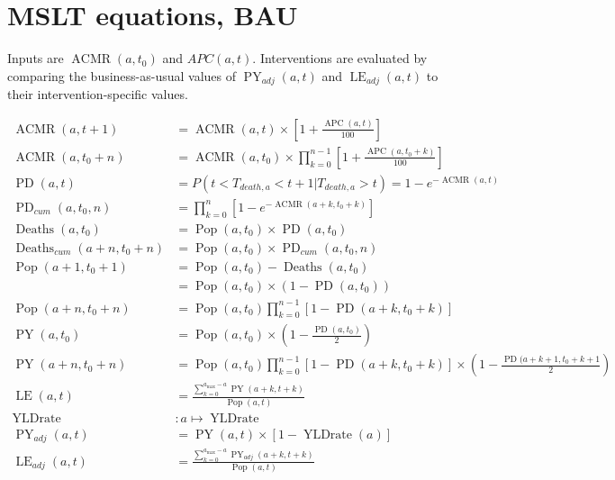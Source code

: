 \documentclass[12pt]{scrartcl}
\DeclareMathOperator{\APC}{APC}
\DeclareMathOperator{\ACMR}{ACMR}
\DeclareMathOperator{\PD}{PD}
\DeclareMathOperator{\PY}{PY}
\DeclareMathOperator{\LE}{LE}
\DeclareMathOperator{\Pop}{Pop}
\DeclareMathOperator{\Deaths}{Deaths}
\DeclareMathOperator{\YLDrate}{YLDrate}
\begin{document}
\section*{MSLT equations, BAU}

Inputs are \(\ACMR(a,t_0)\) and \(APC(a, t)\).
Interventions are evaluated by comparing the business-as-usual values of
\(\PY_{adj}(a, t)\) and \(\LE_{adj}(a, t)\) to their intervention-specific
values.

\begin{align*}
  \ACMR(a, t+1) &= \ACMR(a, t) \times \left[ 1 + \frac{\APC(a, t)}{100}\right] \\
  \ACMR(a, t_0+n) &= \ACMR(a, t_0) \times
  \prod_{k=0}^{n-1} \left[ 1 + \frac{\APC(a, t_0 + k)}{100} \right] \\
  \PD(a, t) &= P(t < T_{death,a} < t + 1 | T_{death,a} > t) = 1 - e^{-\ACMR(a, t)} \\
  \PD_{cum}(a, t_0, n) &= \prod_{k = 0}^n \left[ 1 - e^{-\ACMR(a+k, t_0+k)} \right] \\
  \Deaths(a, t_0) &= \Pop(a, t_0) \times \PD(a, t_0) \\
  \Deaths_{cum}(a+n, t_0+n) &= \Pop(a, t_0) \times \PD_{cum}(a, t_0, n) \\
  \Pop(a+1, t_0+1) &= \Pop(a, t_0) - \Deaths(a, t_0) \\
  &= \Pop(a, t_0) \times (1 - \PD(a, t_0)) \\
  \Pop(a+n, t_0+n) &= \Pop(a, t_0) \prod_{k=0}^{n-1}\left[1 - \PD(a+k, t_0+k)\right]\\
  \PY(a, t_0) &= \Pop(a, t_0) \times \left(1 - \frac{\PD(a,t_0)}{2}\right) \\
  \PY(a+n, t_0+n) &= \Pop(a, t_0) \prod_{k=0}^{n-1} \left[ 1 - \PD(a+k, t_0+k) \right]
  \times \left(1 - \frac{\PD(a+k+1, t_0+k+1}{2}\right) \\
  \LE(a, t) &= \frac{\sum_{k=0}^{a_{\max}-a} \PY(a+k,t+k)}{\Pop(a, t)} \\
  \YLDrate &: a \mapsto \YLDrate \\
  \PY_{adj}(a, t) &= \PY(a, t) \times \left[1 - \YLDrate(a)\right] \\
  \LE_{adj}(a, t) &= \frac{\sum_{k=0}^{a_{\max}-a} \PY_{adj}(a+k, t+k)}{\Pop(a, t)}
\end{align*}
\end{document}
